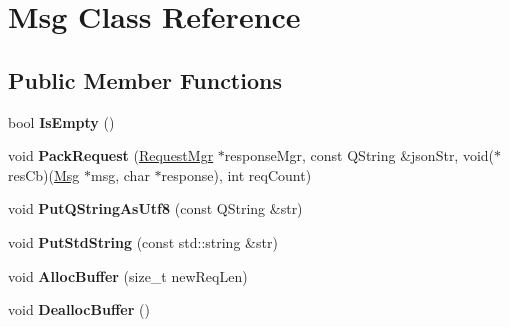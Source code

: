 \hypertarget{class_msg}{}\section{Msg Class Reference}
\label{class_msg}
\subsection*{Public Member Functions}
\begin{DoxyCompactItemize}
\item 
\hypertarget{class_msg_a1a2c2e63cdfab5483a40f922d4341dd3}{}bool {\bfseries Is\+Empty} ()\label{class_msg_a1a2c2e63cdfab5483a40f922d4341dd3}

\item 
\hypertarget{class_msg_a3543a38e8a73dc74fb2221e3f97eb93b}{}void {\bfseries Pack\+Request} (\hyperlink{class_request_mgr}{Request\+Mgr} $\ast$response\+Mgr, const Q\+String \&json\+Str, void($\ast$res\+Cb)(\hyperlink{class_msg}{Msg} $\ast$msg, char $\ast$response), int req\+Count)\label{class_msg_a3543a38e8a73dc74fb2221e3f97eb93b}

\item 
\hypertarget{class_msg_aba69d78592f0d907a9cba08b2302401e}{}void {\bfseries Put\+Q\+String\+As\+Utf8} (const Q\+String \&str)\label{class_msg_aba69d78592f0d907a9cba08b2302401e}

\item 
\hypertarget{class_msg_ab1f7d5f46ce0e886df544c95fe2338c6}{}void {\bfseries Put\+Std\+String} (const std\+::string \&str)\label{class_msg_ab1f7d5f46ce0e886df544c95fe2338c6}

\item 
\hypertarget{class_msg_a329fe1f79a0072f1eabeeb2248c402d5}{}void {\bfseries Alloc\+Buffer} (size\+\_\+t new\+Req\+Len)\label{class_msg_a329fe1f79a0072f1eabeeb2248c402d5}

\item 
\hypertarget{class_msg_a10daf605d89cf0246ab1dc6795cbe958}{}void {\bfseries Dealloc\+Buffer} ()\label{class_msg_a10daf605d89cf0246ab1dc6795cbe958}

\end{DoxyCompactItemize}
